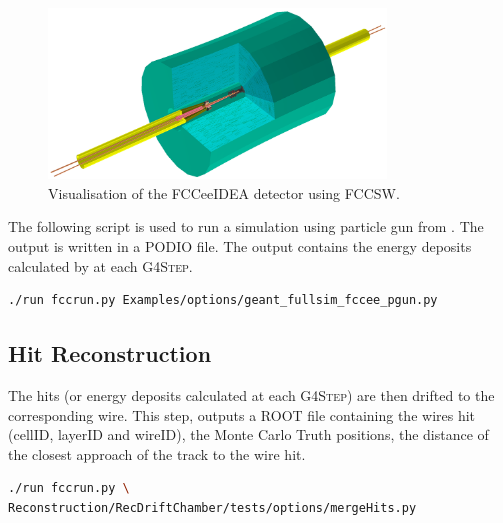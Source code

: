 \begin{figure}[!t]
\centering
\includegraphics[width=0.8\textwidth]{figures/FCCeeIDEA_IR}

\caption{Visualisation of the FCCeeIDEA detector using FCCSW.}
\label{fig_sim_vis}
\end{figure}

The following script is used to run a simulation using particle gun from . The output is written in a PODIO file. The output contains the energy deposits calculated by  at each \textsc{G4Step}.

\begin{lstlisting}[language=bash,caption={Particle gun simulation.}]
./run fccrun.py Examples/options/geant_fullsim_fccee_pgun.py
\end{lstlisting}

\subsection{Hit Reconstruction}

The hits (or energy deposits calculated at each \textsc{G4Step}) are then drifted to the corresponding wire. This step, outputs a ROOT file containing the wires hit (cellID, layerID and wireID), the Monte Carlo Truth positions, the distance of the closest approach of the track to the wire hit.
\begin{lstlisting}[language=bash,caption={Reconstruction of the simulated hits for the drift chamber.}]
./run fccrun.py \ 
Reconstruction/RecDriftChamber/tests/options/mergeHits.py
\end{lstlisting}
